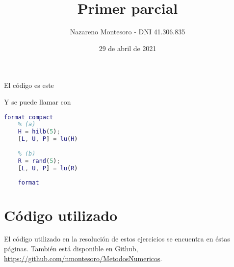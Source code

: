 \documentclass{article}
\title{Primer parcial}
\author{Nazareno Montesoro - DNI 41.306.835}
\date{29 de abril de 2021}
\begin{document}
\maketitle

El código es este



Y se puede llamar con

\begin{lstlisting}[language=Matlab]
    format compact
    % (a)
    H = hilb(5);
    [L, U, P] = lu(H)
    
    % (b)
    R = rand(5);
    [L, U, P] = lu(R)
    
    format
\end{lstlisting}

\section{Código utilizado}
El código utilizado en la resolución de estos ejercicios se encuentra en éstas páginas. 
También está disponible en Github, \url{https://github.com/nmontesoro/MetodosNumericos}.
\end{document}
